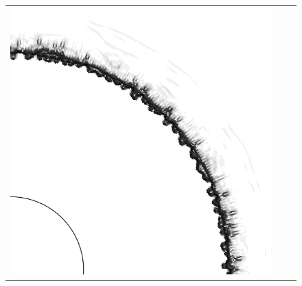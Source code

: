 \documentclass[preprint, 11pt]{article}
\begin{document}
\begin{figure}[!h]
{\begin{tabular}{ccc}
      \includegraphics[scale=0.3]{figures/chj_r2_roe_p3.png}
    \end{tabular}
  }


\end{figure}
\end{document}
